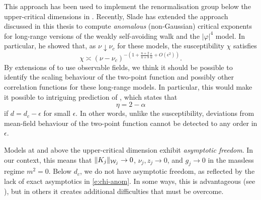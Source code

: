 
This approach has been used to implement the renormalisation group below the
upper-critical dimensions in \cite{BDH98,MS00,BMS03,Abde07}. Recently, Slade
\cite{Slad17} has extended the approach discussed in this thesis to compute
\emph{anomalous} (non-Gaussian) critical exponents for long-range versions of
the weakly self-avoiding walk and the $|\varphi|^4$ model. In particular, he
showed that, as $\nu\downarrow\nu_c$ for these models, the susceptibility $\chi$
satisfies
\begin{equation}
\label{e:chi-anom}
\chi
	\asymp
(\nu - \nu_c)^{-\left(1 + \tfrac{n+2}{n+8} \tfrac{\epsilon}{\alpha} + O(\epsilon^2)\right)}.
\end{equation}
By extensions of \cite{Slad17} to use observable fields, we think it should
be possible to identify the scaling behaviour of the two-point function and possibly
other correlation functions for these long-range models. In particular, this would
make it possible to  intriguing prediction of \cite{FMN72}, which
states that
\begin{equation}
\eta = 2 - \alpha
\end{equation}
if $d = d_c - \epsilon$ for small $\epsilon$. In other words, unlike the susceptibility,
deviations from mean-field behaviour of the two-point function cannot be detected
to any order in $\epsilon$.

\begin{rk}
Models at and above the upper-critical dimension exhibit \emph{asymptotic freedom}.
In our context, this means that $\|K_j\|_{\mathcal{W}_j} \rightarrow 0$,
$\nu_j, z_j \to 0$, and $g_j \to 0$ in the massless regime $m^2 = 0$. Below $d_c$, we do
not have asymptotic freedom, as reflected by the lack of exact asymptotics in
\eqref{e:chi-anom}. In some ways, this is advantageous (see \cite{Slad17}), but
in others it creates additional difficulties that must be overcome.
\end{rk}

